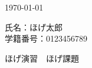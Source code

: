 \documentclass[dvipsnames, lualatex]{jlreq}
\begin{document}
\begin{flushleft}
  \today
\end{flushleft}

\begin{flushright}
  氏名：ほげ太郎\\ 学籍番号：0123456789
\end{flushright}
\vspace{2\zh}

\begin{center}
  {\Large ほげ演習　ほげ課題}
\end{center}
\vspace{3\zh}




\end{document}
